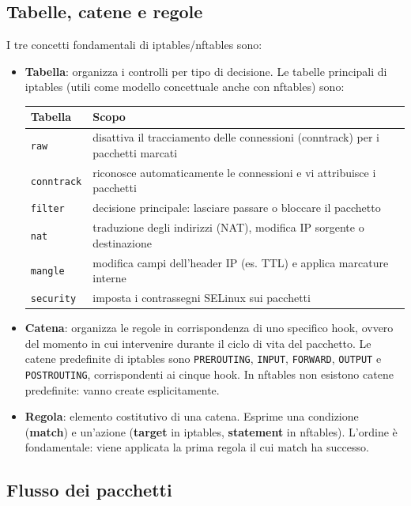 \documentclass[12pt, a4paper]{report}
\begin{document}
\subsection{Tabelle, catene e regole}
I tre concetti fondamentali di iptables/nftables sono:
\begin{itemize}
	\item \textbf{Tabella}: organizza i controlli per tipo di decisione. Le tabelle principali di iptables (utili come modello concettuale anche con nftables) sono:
	
	\begin{table}[H]
		\centering
		\begin{tabular}{|l|p{10cm}|}
			\hline
			\textbf{Tabella} & \textbf{Scopo} \\ \hline
			\texttt{raw} & disattiva il tracciamento delle connessioni (conntrack) per i pacchetti marcati \\ \hline
			\texttt{conntrack} & riconosce automaticamente le connessioni e vi attribuisce i pacchetti \\ \hline
			\texttt{filter} & decisione principale: lasciare passare o bloccare il pacchetto \\ \hline
			\texttt{nat} & traduzione degli indirizzi (NAT), modifica IP sorgente o destinazione \\ \hline
			\texttt{mangle} & modifica campi dell'header IP (es. TTL) e applica marcature interne \\ \hline
			\texttt{security} & imposta i contrassegni SELinux sui pacchetti \\ \hline
		\end{tabular}
	\end{table}
	
	\item \textbf{Catena}: organizza le regole in corrispondenza di uno specifico hook, ovvero del momento in cui intervenire durante il ciclo di vita del pacchetto. Le catene predefinite di iptables sono \texttt{PREROUTING}, \texttt{INPUT}, \texttt{FORWARD}, \texttt{OUTPUT} e \texttt{POSTROUTING}, corrispondenti ai cinque hook. In nftables non esistono catene predefinite: vanno create esplicitamente.
	\item \textbf{Regola}: elemento costitutivo di una catena. Esprime una condizione (\textbf{match}) e un'azione (\textbf{target} in iptables, \textbf{statement} in nftables). L'ordine è fondamentale: viene applicata la prima regola il cui match ha successo.
\end{itemize}

\subsection{Flusso dei pacchetti}
\end{document}
